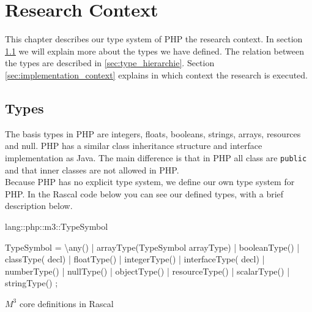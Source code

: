 \documentclass[../main.tex]{subfiles}
\begin{document}
    \chapter{Research Context}\label{ch:inference_design_context}

	This chapter describes our type system of PHP the research context.
    In section \ref{sec:types} we will explain more about the types we have defined.
    The relation between the types are described in \ref{sec:type_hierarchie}.
    Section \ref{sec:implementation_context} explains in which context the research is executed.
    
	\section{Types}\label{sec:types}
	The basis types in PHP are integers, floats, booleans, strings, arrays, resources and null.
	PHP has a similar class inheritance structure and interface implementation as Java.
    The main difference is that in PHP all class are \texttt{public} and that inner classes are not allowed in PHP. 
    \\
	Because PHP has no explicit type system, we define our own type system for PHP.
	In the Rascal code below you can see our defined types, with a brief description below.
	\begin{program}
    \begin{rascal}
 lang::php::m3::TypeSymbol
 
 TypeSymbol
  = \textbackslash{}any()\footnotemark                         {}
  | arrayType(TypeSymbol arrayType) 
  | booleanType()                   
  | classType( decl)             
  | floatType()                     
  | integerType()                   
  | interfaceType( decl)         
  | numberType()                    
  | nullType()                      
  | objectType()                    
  | resourceType()                  
  | scalarType()                    
  | stringType()                    
  ; 
    \end{rascal}
	\caption{$M^3$ core definitions in Rascal}
	\label{fig:rascal_typesymbols}
	\end{program} 
    
\end{document}
